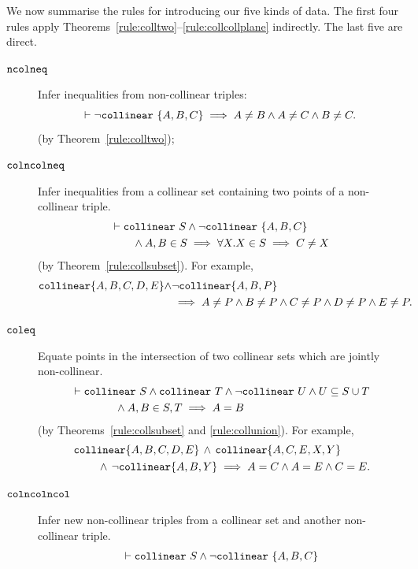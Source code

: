 We now summarise the rules for introducing our five kinds of data. The first four rules apply Theorems~\ref{rule:colltwo}--\ref{rule:collcollplane} indirectly. The last five are direct.
\begin{description}
\item[$\texttt{ncolneq}$] Infer inequalities from non-collinear triples:
\begin{displaymath}
\vdash\neg\texttt{collinear}\ \{A,B,C\} \implies A \neq B \wedge A \neq C \wedge B \neq C.
\end{displaymath} (by Theorem~\ref{rule:colltwo});
\item[$\texttt{colncolneq}$] Infer inequalities from a collinear set containing two points of a non-collinear triple. 
\begin{align*}
  &\vdash\code{collinear}\ S \wedge \neg\code{collinear}\ \{A,B,C\}\\
  &\qquad\wedge A,B \in S \implies \forall X. X \in S \implies C \neq X
\end{align*}(by Theorem~\ref{rule:collsubset}). For example, 
\begin{align*}
\texttt{collinear} \{A, B, C, D, E\} \wedge & \neg\texttt{collinear} \{A, B, P\}\\
&\implies A \neq P \wedge B \neq P \wedge C \neq P \wedge D \neq P \wedge E \neq P.
\end{align*}
\item[$\texttt{coleq}$]\label{rule:coleq}
Equate points in the intersection of two collinear sets which are jointly non-collinear.
\begin{align*}
&\vdash\texttt{collinear}\ S \wedge \texttt{collinear}\ T \wedge \neg\texttt{collinear}\ U \wedge U \subseteq S \cup T \\
&\qquad\qquad\wedge A,B \in S,T \implies A = B
\end{align*} (by Theorems~\ref{rule:collsubset} and \ref{rule:collunion}).
For example,
\begin{align*}\
&\texttt{collinear} \{A, B, C, D, E\} \,\wedge\,\texttt{collinear} \{A, C, E, X, Y\}\\ 
&\qquad\, \wedge\,\neg\texttt{collinear} \{A, B, Y\}\implies A = C \wedge A = E \wedge C = E.
\end{align*}
\item[$\texttt{colncolncol}$] Infer new non-collinear triples from a collinear set and another non-collinear triple.
\begin{align*}
  &\vdash\code{collinear}\ S \wedge \neg\code{collinear}\ \{A,B,C\}\\

\end{align*}
\end{description}
